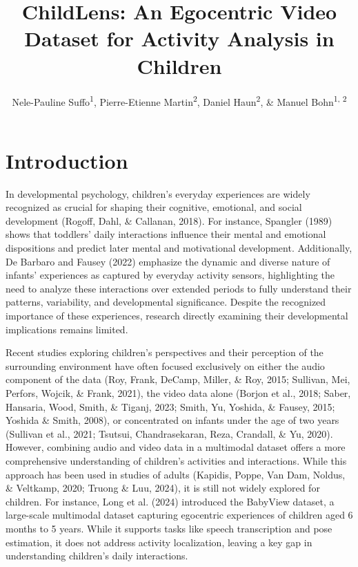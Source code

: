 \documentclass[
  man,floatsintext]{apa6}
\title{ChildLens: An Egocentric Video Dataset for Activity Analysis in Children}
\author{Nele-Pauline Suffo\textsuperscript{1}, Pierre-Etienne Martin\textsuperscript{2}, Daniel Haun\textsuperscript{2}, \& Manuel Bohn\textsuperscript{1, 2}}
\date{}
\affiliation{\vspace{0.5cm}\textsuperscript{1} Institute of Psychology in Education, Leuphana University Lüneburg\\\textsuperscript{2} Max Planck Institute for Evolutionary Anthropology}
\begin{document}
\maketitle

\section{Introduction}\label{introduction}

In developmental psychology, children's everyday experiences are widely recognized as crucial for shaping their cognitive, emotional, and social development (Rogoff, Dahl, \& Callanan, 2018). For instance, Spangler (1989) shows that toddlers' daily interactions influence their mental and emotional dispositions and predict later mental and motivational development. Additionally, De Barbaro and Fausey (2022) emphasize the dynamic and diverse nature of infants' experiences as captured by everyday activity sensors, highlighting the need to analyze these interactions over extended periods to fully understand their patterns, variability, and developmental significance. Despite the recognized importance of these experiences, research directly examining their developmental implications remains limited.

Recent studies exploring children's perspectives and their perception of the surrounding environment have often focused exclusively on either the audio component of the data (Roy, Frank, DeCamp, Miller, \& Roy, 2015; Sullivan, Mei, Perfors, Wojcik, \& Frank, 2021), the video data alone (Borjon et al., 2018; Saber, Hansaria, Wood, Smith, \& Tiganj, 2023; Smith, Yu, Yoshida, \& Fausey, 2015; Yoshida \& Smith, 2008), or concentrated on infants under the age of two years (Sullivan et al., 2021; Tsutsui, Chandrasekaran, Reza, Crandall, \& Yu, 2020). However, combining audio and video data in a multimodal dataset offers a more comprehensive understanding of children's activities and interactions. While this approach has been used in studies of adults (Kapidis, Poppe, Van Dam, Noldus, \& Veltkamp, 2020; Truong \& Luu, 2024), it is still not widely explored for children. For instance, Long et al. (2024) introduced the BabyView dataset, a large-scale multimodal dataset capturing egocentric experiences of children aged 6 months to 5 years. While it supports tasks like speech transcription and pose estimation, it does not address activity localization, leaving a key gap in understanding children's daily interactions.
\end{document}
